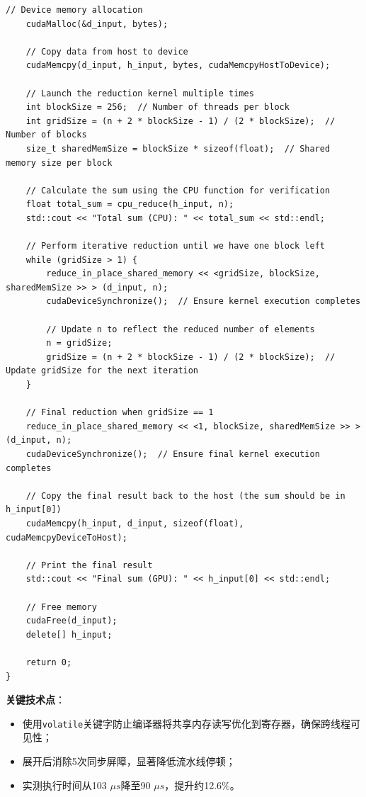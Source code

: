 \begin{lstlisting}[caption={Warp级循环展开设备函数}]
    // Device memory allocation
    cudaMalloc(&d_input, bytes);

    // Copy data from host to device
    cudaMemcpy(d_input, h_input, bytes, cudaMemcpyHostToDevice);

    // Launch the reduction kernel multiple times
    int blockSize = 256;  // Number of threads per block
    int gridSize = (n + 2 * blockSize - 1) / (2 * blockSize);  // Number of blocks
    size_t sharedMemSize = blockSize * sizeof(float);  // Shared memory size per block

    // Calculate the sum using the CPU function for verification
    float total_sum = cpu_reduce(h_input, n);
    std::cout << "Total sum (CPU): " << total_sum << std::endl;

    // Perform iterative reduction until we have one block left
    while (gridSize > 1) {
        reduce_in_place_shared_memory << <gridSize, blockSize, sharedMemSize >> > (d_input, n);
        cudaDeviceSynchronize();  // Ensure kernel execution completes

        // Update n to reflect the reduced number of elements
        n = gridSize;
        gridSize = (n + 2 * blockSize - 1) / (2 * blockSize);  // Update gridSize for the next iteration
    }

    // Final reduction when gridSize == 1
    reduce_in_place_shared_memory << <1, blockSize, sharedMemSize >> > (d_input, n);
    cudaDeviceSynchronize();  // Ensure final kernel execution completes

    // Copy the final result back to the host (the sum should be in h_input[0])
    cudaMemcpy(h_input, d_input, sizeof(float), cudaMemcpyDeviceToHost);

    // Print the final result
    std::cout << "Final sum (GPU): " << h_input[0] << std::endl;

    // Free memory
    cudaFree(d_input);
    delete[] h_input;

    return 0;
}
\end{lstlisting}

\noindent \textbf{关键技术点}：
\begin{itemize}
    \item 使用\verb|volatile|关键字防止编译器将共享内存读写优化到寄存器，确保跨线程可见性；
    \item 展开后消除5次同步屏障，显著降低流水线停顿；
    \item 实测执行时间从103 $\mu s$降至90 $\mu s$，提升约12.6\%。
\end{itemize}

